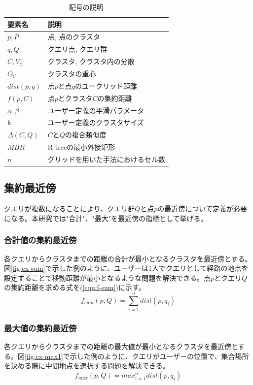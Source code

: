 \documentclass{deimj}
\begin{document}
\begin{table}[htb]
  \begin{center}
    \begin{tabular}{|l|l|} \hline
      要素名 & 説明 \\ \hline \hline
      $p, P$ & 点, 点のクラスタ \\ \hline
      $q, Q$ & クエリ点, クエリ群 \\ \hline
      $C, V_C$ & クラスタ, クラスタ内の分散 \\ \hline
      $O_C$ & クラスタの重心 \\ \hline
      $dist(p,q)$ & 点$p$と点$q$のユークリッド距離 \\ \hline
      $f(p, C)$  & 点$p$とクラスタ$C$の集約距離 \\ \hline
      $\alpha, \beta$ & ユーザー定義の平滑パラメータ \\ \hline
      $k$ & ユーザー定義のクラスタサイズ \\ \hline
      $\Delta(C,Q)$ & $C$と$Q$の複合類似度 \\ \hline
      $MBR$ & R-treeの最小外接矩形 \\ \hline
      $n$ & グリッドを用いた手法におけるセル数 \\ \hline
    \end{tabular}
    \caption{記号の説明}
    \label{tab:var}
  \end{center}
\end{table}

\subsection{集約最近傍}
クエリが複数になることにより、クエリ群$Q$と点$p$の最近傍について定義が必要になる。本研究では"合計"、"最大"を最近傍の指標として挙げる。
\subsubsection{合計値の集約最近傍}
各クエリからクラスタまでの距離の合計が最小となるクラスタを最近傍とする。図\ref{fig:ex-sum}で示した例のように、ユーザーは1人でクエリとして経路の地点を設定することで移動距離が最小となるような問題を解決できる。点$p$とクエリ$Q$の集約距離を求める式を(\ref{equ:f-sum})に示す。
\begin{equation}
\label{equ:f-sum}
f_{sum}(p,Q) = \sum_{i=1}^{n} dist(p,q_i)
\end{equation}

\subsubsection{最大値の集約最近傍}
各クエリからクラスタまでの距離の最大値が最小となるクラスタを最近傍とする。図\ref{fig:ex-max1}で示した例のように、クエリがユーザーの位置で、集合場所を決める際に中間地点を選択する問題を解決できる。
\begin{equation}
\label{equ:f-max}
f_{max}(p,Q) = max_{i=1}^{n} dist(p,q_i)
\end{equation}
\end{document}
